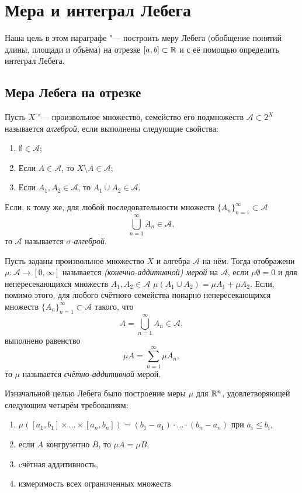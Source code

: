 \documentclass[main]{subfiles}
\begin{document}
\section{Мера и интеграл Лебега}%
Наша цель в этом параграфе "---
построить меру Лебега
(обобщение понятий длины, площади и объёма)
на отрезке \( [a, b] \subset \mathbb{R} \)
и с её помощью определить интеграл Лебега.

\subsection{Мера Лебега на отрезке}
\begin{definition}
  Пусть \( X \) "--- произвольное
  множество, семейство его подмножеств
  \( \mathcal{A} \subset 2^X \)
  называется \emph{алгеброй},
  если выполнены следующие свойства:
  \begin{enumerate}
    \item \( \emptyset \in \mathcal{A} \);
    \item Если \( A \in \mathcal{A} \),
      то \( X \setminus A \in \mathcal{A} \);
    \item Если \( A_1, A_2 \in \mathcal{A} \),
      то \( A_1 \cup A_2 \in \mathcal{A} \).
  \end{enumerate}
  Если, к тому же, для любой последовательности
  множеств \( {\{ A_n \}}_{n=1}^\infty \subset \mathcal{A} \)
  \[
    \bigcup_{n=1}^\infty A_n \in \mathcal{A},
  \]
  то \( \mathcal{A} \) называется \emph{\( \sigma \)-алгеброй}.
\end{definition}

\begin{definition}
  Пусть заданы произвольное множество \( X \)
  и алгебра \( \mathcal{A} \) на нём.
  Тогда отображени \( \mu : \mathcal{A} \to [0, \infty] \)
  называется \emph{(конечно-аддитивной) мерой}
  на \( \mathcal{A} \), если \( \mu \emptyset = 0 \)
  и для непересекающихся множеств \( A_1, A_2 \in \mathcal{A} \)
  \( \mu(A_1 \cup A_2) = \mu A_1 + \mu A_2 \).
  Если, помимо этого,
  для любого счётного семейства
  попарно непересекающихся множеств
  \( {\{ A_n \}}_{n=1}^\infty \subset \mathcal{A} \)
  такого, что
  \[ A = \bigcup_{n = 1}^\infty A_n \in \mathcal{A}, \]
  выполнено равенство
  \[ \mu A = \sum_{n=1}^\infty \mu A_n, \]
  то \( \mu \) называется \emph{счётно-аддитивной} мерой.
\end{definition}

Изначальной целью Лебега было
построение меры \( \mu \) для \( \mathbb{R}^n \),
удовлетворяющей следующим четырём требованиям:
\begin{enumerate}
  \item \( \mu ([a_1, b_1] \times \ldots \times [a_n, b_n]) =
    (b_1 - a_1) \cdot \ldots \cdot (b_n - a_n) \)
    при \( a_i \le b_i \),
  \item если \( A \) конгруэнтно \( B \), то
    \( \mu A = \mu B \),
  \item cчётная аддитивность,
  \item измеримость всех ограниченных множеств.
\end{enumerate}
\end{document}
